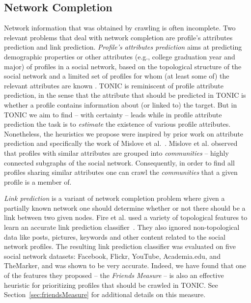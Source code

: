 \documentclass[journal]{IEEEtran}
\begin{document}
\subsection{Network Completion}
Network information that was obtained by crawling is often incomplete. 
Two relevant problems that deal with network completion are profile's attributes prediction and link prediction.  
{\em Profile's attributes prediction} aims at predicting demographic properties or other attributes (e.g., college graduation year and major) of profiles in a social network, based on the topological structure of the social network and a limited set of profiles for whom (at least some of) the relevant attributes are known \cite{fire2011linkPrediction,mislove2010youAreWho,altshuler2011incremental}. 
TONIC is reminiscent of profile attribute prediction, in the sense that the attribute that should be predicted in TONIC is whether a profile contains information about (or linked to) the target. But in TONIC we aim to find -- with certainty -- leads while in profile attribute prediction the task is to {\em estimate} the existence of various profile attributes. Nonetheless, the heuristics we propose were inspired by prior work on attribute prediction and specifically the work of Mislove et al.~\cite{mislove2010youAreWho}. Mislove et al. observed that profiles with similar attributes are grouped into {\em communities} -- highly connected subgraphs of the social network. 
Consequently, in order to find all profiles sharing similar attributes one can crawl the {\em communities} that a given profile is a member of. 



{\em Link prediction} is a variant of network completion problem where given a partially known network one should determine whether or not there should be a link between two given nodes. 
Fire et al. used a variety of topological features to learn an accurate link prediction classifier~\cite{fire2011linkPrediction,fire2014computationallyEfficient}. They also ignored non-topological data like posts, pictures, keywords and other content related to the social network profiles. The resulting link prediction classifier was evaluated 
on five social network datasets: Facebook, Flickr, YouTube, Academia.edu, and TheMarker, and was shown to be very accurate. 
Indeed, we have found that one of the features they proposed --  the \emph{Friends Measure} -- is also an effective heuristic for  prioritizing profiles that should be crawled in TONIC. See Section~\ref{sec:friendsMeasure} for additional details on this measure.  
\end{document}
